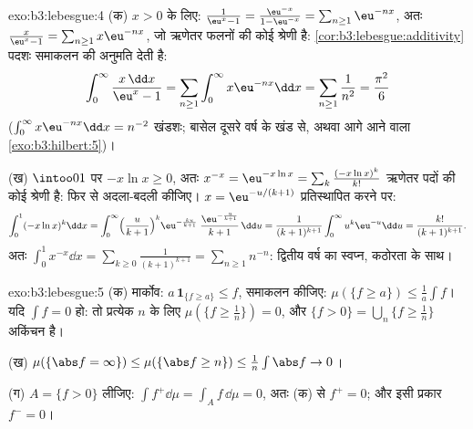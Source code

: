 \begin{solution}{exo:b3:lebesgue:4}
(क) $x > 0$ के लिए: $\frac1{\eu^x - 1} = \frac{\eu^{-x}}{1 -
\eu^{-x}} = \sum_{n\geq1}\eu^{-nx}$, अतः $\frac{x}{\eu^x - 1} =
\sum_{n\geq1}x\eu^{-nx}$, जो ऋणेतर  फलनों की कोई श्रेणी
है: \cref{cor:b3:lebesgue:additivity} पदशः समाकलन की अनुमति देती है:
\[
\int_0^\infty\frac{x\,\dd x}{\eu^x - 1}
= \sum_{n\geq1}\int_0^\infty x\eu^{-nx}\dd x
= \sum_{n\geq1}\frac1{n^2} = \frac{\pi^2}6
\]
($\int_0^\infty x\eu^{-nx}\dd x = n^{-2}$ खंडशः; बासेल दूसरे वर्ष के खंड से, अथवा आगे आने वाला \cref{exo:b3:hilbert:5})।

(ख) $\intoo01$ पर $-x\ln x \geq 0$, अतः $x^{-x} =
\eu^{-x\ln x} = \sum_k\frac{(-x\ln x)^k}{k!}$ ऋणेतर पदों की कोई श्रेणी है: फिर से
अदला-बदली कीजिए। $x =
\eu^{-u/(k+1)}$ प्रतिस्थापित करने पर:
\[
\int_0^1(-x\ln x)^k\dd x
= \int_0^\infty\Bigl(\frac{u}{k+1}\Bigr)^{k}
\eu^{-\frac{ku}{k+1}}\;\frac{\eu^{-\frac u{k+1}}}{k+1}\,\dd u
= \frac{1}{(k+1)^{k+1}}\int_0^\infty u^k\eu^{-u}\dd u
= \frac{k!}{(k+1)^{k+1}} .
\]
अतः $\int_0^1x^{-x}\dd x = \sum_{k\geq0}\frac{1}{(k+1)^{k+1}}
= \sum_{n\geq1}n^{-n}$: द्वितीय वर्ष का स्वप्न, कठोरता के साथ।
\end{solution}

\begin{solution}{exo:b3:lebesgue:5}
(क) मार्कोव: $a\,\mathbf 1_{\{f \geq a\}} \leq f$, समाकलन कीजिए: $\mu(\{f \geq a\}) \leq \frac1a\int f$। यदि $\int f = 0$ हो: तो प्रत्येक
$n$ के लिए $\mu(\{f \geq \frac1n\}) = 0$, और $\{f > 0\} =
\bigcup_n\{f \geq \frac1n\}$ अकिंचन है।

(ख) $\mu(\{\abs f = \infty\}) \leq \mu(\{\abs f \geq n\}) \leq
\frac1n\int\abs f \to 0$।

(ग) $A = \{f > 0\}$ लीजिए: $\int f^+\dd\mu = \int_Af\,\dd\mu =
0$, अतः (क) से  $f^+ = 0$; और इसी प्रकार
 $f^- = 0$।
\end{solution}


